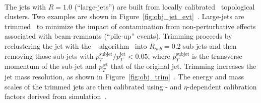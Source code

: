 \paragraph{}
The jets with $R=1.0$ (``large-\R jets'') are built from locally calibrated~\cite{Aad:2011he} topological clusters.
Two examples are shown in Figure~\ref{fig:obj_jet_evt}~\cite{ATLAS-CONF-2015-035}.
Large-\R jets are trimmed~\cite{Krohn2010} to minimize the impact of contamination from non-perturbative effects associated with beam-remnants (``pile-up'' events).
Trimming proceeds by reclustering the jet with the \kt~ algorithm~\cite{Ellis:1993tq} into $R_{sub} = 0.2$ sub-jets and then removing those sub-jets with $p_T^{\mathrm{subjet}}/p_T^{\mathrm{jet}} < 0.05$, where $p_T^{\mathrm{subjet}}$ is the transverse momentum of the sub-jet and $p_T^{\mathrm{jet}}$ that of the original jet.
Trimming increases the jet mass resolution, as shown in Figure~\ref{fig:obj_trim}~\cite{ATL-PHYS-PUB-2017-020}.
The energy and mass scales of the trimmed jets are then calibrated using \pt- and $\eta$-dependent calibration factors derived from simulation~\cite{PERF-2012-02}.

